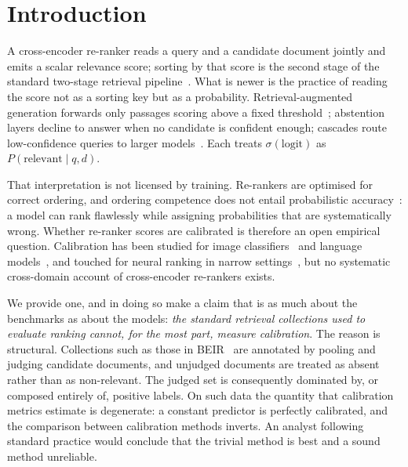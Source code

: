 \documentclass[sigconf,nonacm]{acmart}
\newcommand{\sig}{\sigma}
\begin{document}

\maketitle

\section{Introduction}\label{sec:intro}

A cross-encoder re-ranker reads a query and a candidate document jointly and emits a
scalar relevance score; sorting by that score is the second stage of the standard
two-stage retrieval pipeline~\cite{nogueira2019}. What is newer is the practice of
reading the score not as a sorting key but as a probability. Retrieval-augmented
generation forwards only passages scoring above a fixed threshold~\cite{lewis2020rag};
abstention layers decline to answer when no candidate is confident enough; cascades
route low-confidence queries to larger models~\cite{gao2024rag}. Each treats
$\sig(\text{logit})$ as $P(\text{relevant} \mid q, d)$.

That interpretation is not licensed by training. Re-rankers are optimised for correct
ordering, and ordering competence does not entail probabilistic
accuracy~\cite{degroot1983,guo2017}: a model can rank flawlessly while assigning
probabilities that are systematically wrong. Whether re-ranker scores are calibrated
is therefore an open empirical question. Calibration has been studied for image
classifiers~\cite{guo2017,minderer2021} and language
models~\cite{kadavath2022,geng2024survey}, and touched for neural ranking in narrow
settings~\cite{penha2021,cohen2021}, but no systematic cross-domain account of
cross-encoder re-rankers exists.

We provide one, and in doing so make a claim that is as much about the benchmarks as
about the models: \emph{the standard retrieval collections used to evaluate ranking
cannot, for the most part, measure calibration}. The reason is structural.
Collections such as those in BEIR~\cite{thakur2021beir} are annotated by pooling and
judging candidate documents, and unjudged documents are treated as absent rather than
as non-relevant. The judged set is consequently dominated by, or composed entirely
of, positive labels. On such data the quantity that calibration metrics estimate is
degenerate: a constant predictor is perfectly calibrated, and the comparison between
calibration methods inverts. An analyst following standard practice would conclude
that the trivial method is best and a sound method unreliable.
\end{document}
